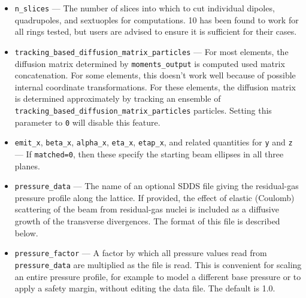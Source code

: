\documentclass[11pt]{article}
\begin{document}
\begin{itemize}
  Because IBS depends on the beam dimensions, the computation is iterative. A suggested minimum value of \verb|ibs_iterations| is
  10. By default, the output file contains only the results of the final iteration; if \verb|ibs_output_iterations| is non-zero,
  results are output for each iteration, which can be used to check convergence. There are several parameters in the output file
  that can also be used, namely, \verb|e1Convergence|, \verb|e2Convergence|, and \verb|e3Convergence|, which give the fractional
  change in the normal-mode emittances from the final step. If the Coulomb log is not positive, it will be computed using
  the method outlined in \cite{KuboOide}.
\item \verb|n_slices| --- The number of slices into which to cut individual dipoles, quadrupoles, and sextuoples for computations.
  10 has been found to work for all rings tested, but users are advised to ensure it is sufficient for their cases.
\item \verb|tracking_based_diffusion_matrix_particles| --- For most elements, the diffusion matrix determined by 
  \verb|moments_output| is computed used matrix concatenation. For some elements, this doesn't work well because of
  possible internal coordinate transformations. For these elements, the diffusion matrix is determined approximately
  by tracking an ensemble of \verb|tracking_based_diffusion_matrix_particles| particles. Setting this parameter to \verb|0|
  will disable this feature.
\item \verb|emit_x|, \verb|beta_x|, \verb|alpha_x|, \verb|eta_x|, \verb|etap_x|, and related quantities for \verb|y| and \verb|z| ---
  If \verb|matched=0|, then these specify the starting beam ellipses in all three planes.
\item \verb|pressure_data| --- The name of an optional SDDS file giving the residual-gas pressure
  profile along the lattice. If provided, the effect of elastic (Coulomb) scattering of the beam
  from residual-gas nuclei is included as a diffusive growth of the transverse divergences. The
  format of this file is described below.
\item \verb|pressure_factor| --- A factor by which all pressure values read from \verb|pressure_data|
  are multiplied as the file is read. This is convenient for scaling an entire pressure profile, for
  example to model a different base pressure or to apply a safety margin, without editing the data
  file. The default is 1.0.
\end{itemize}
\end{document}
